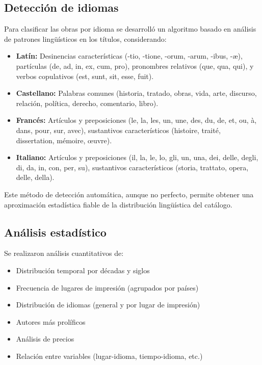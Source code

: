 \documentclass[12pt,a4paper]{article}
\begin{document}
\subsection{Detección de idiomas}

Para clasificar las obras por idioma se desarrolló un algoritmo basado en análisis de patrones lingüísticos en los títulos, considerando:

\begin{itemize}
    \item \textbf{Latín:} Desinencias características (-tio, -tione, -orum, -arum, -ibus, -æ), partículas (de, ad, in, ex, cum, pro), pronombres relativos (que, qua, qui), y verbos copulativos (est, sunt, sit, esse, fuit).

    \item \textbf{Castellano:} Palabras comunes (historia, tratado, obras, vida, arte, discurso, relación, política, derecho, comentario, libro).

    \item \textbf{Francés:} Artículos y preposiciones (le, la, les, un, une, des, du, de, et, ou, à, dans, pour, sur, avec), sustantivos característicos (histoire, traité, dissertation, mémoire, œuvre).

    \item \textbf{Italiano:} Artículos y preposiciones (il, la, le, lo, gli, un, una, dei, delle, degli, di, da, in, con, per, su), sustantivos característicos (storia, trattato, opera, delle, della).
\end{itemize}

Este método de detección automática, aunque no perfecto, permite obtener una aproximación estadística fiable de la distribución lingüística del catálogo.

\subsection{Análisis estadístico}

Se realizaron análisis cuantitativos de:

\begin{itemize}
    \item Distribución temporal por décadas y siglos
    \item Frecuencia de lugares de impresión (agrupados por países)
    \item Distribución de idiomas (general y por lugar de impresión)
    \item Autores más prolíficos
    \item Análisis de precios
    \item Relación entre variables (lugar-idioma, tiempo-idioma, etc.)
\end{itemize}
\end{document}
